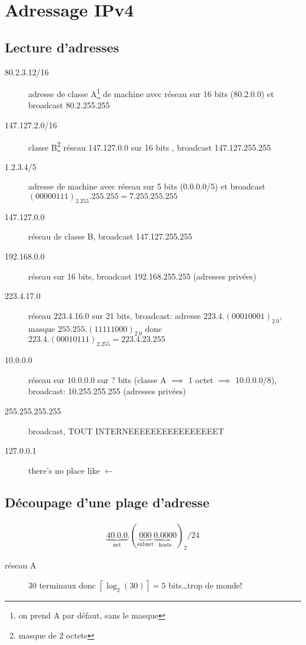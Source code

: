 \documentclass{article}
\begin{document}
   \section{Adressage IPv4}
   \subsection{Lecture d'adresses}
    
   \begin{description}
       \item[80.2.3.12/16] adresse de classe A\footnote{on prend A par défaut, sans le masque} de machine avec réseau sur 16 bits (80.2.0.0) et broadcast 80.2.255.255
       \item[147.127.2.0/16] classe B\footnote{masque de 2 octets} réseau 147.127.0.0 sur 16 bits , broadcast 147.127.255.255
       \item[1.2.3.4/5] adresse de machine avec réseau sur 5 bits (0.0.0.0/5) et broadcast $(00000111)_2.255.255.255 = 7.255.255.255$
        \item[147.127.0.0] réseau de classe B, broadcast 147.127.255.255
        \item[192.168.0.0] réseau sur 16 bits, broadcast 192.168.255.255 (adresses privées)
        \item[223.4.17.0] réseau 223.4.16.0 sur 21 bits, broadcast: adresse $223.4.(0001 0001)_2.0$, masque $255.255.(1111 1000)_2.0$ donc  $223.4.(0001 0111)_2.255 = 223.4.23.255$
        \item[10.0.0.0] réseau sur 10.0.0.0 sur ? bits (classe A $\implies$ 1 octet $\implies$ 10.0.0.0/8), broadcast: 10.255.255.255 (adresses privées)
        \item[255.255.255.255] broadcast, TOUT INTERNEEEEEEEEEEEEEEEET
        \item[127.0.0.1] there's no place like $\leftarrow$
   \end{description}

   \subsection{Découpage d'une plage d'adresse}
   \begin{align*}
       \underbrace{40.0.0}_{\text{net}}.(\underbrace{000}_{\text{subnet}}\underbrace{0.0000}_{\text{hosts}})_2/24
   \end{align*}

   \begin{description}
       \item[réseau A] 30 terminaux donc $\left\lceil \log_2(30)  \right\rceil = 5$ bits\ldots trop de monde!
   \end{description}
\end{document}
